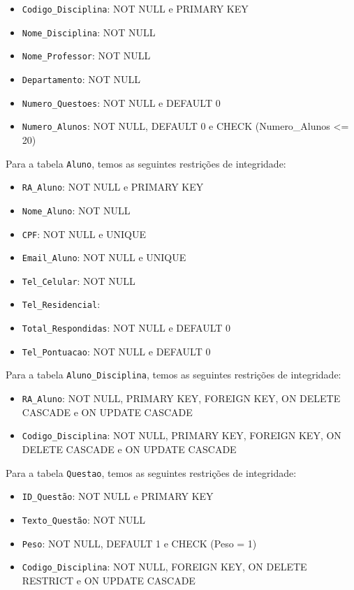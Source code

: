 \documentclass[12pt,a4paper]{article}
\begin{document}
\begin{itemize}
    \item {\texttt{Codigo\_Disciplina}}: NOT NULL e PRIMARY KEY
    \item {\texttt{Nome\_Disciplina}}: NOT NULL
    \item {\texttt{Nome\_Professor}}: NOT NULL
    \item {\texttt{Departamento}}: NOT NULL
    \item {\texttt{Numero\_Questoes}}: NOT NULL e DEFAULT 0
    \item {\texttt{Numero\_Alunos}}: NOT NULL, DEFAULT 0 e CHECK (Numero\_Alunos <= 20) 
\end{itemize}

\vspace{0.5cm}
Para a tabela \texttt{Aluno}, temos as seguintes restrições de integridade:

\begin{itemize}
    \item {\texttt{RA\_Aluno}}: NOT NULL e PRIMARY KEY
    \item {\texttt{Nome\_Aluno}}: NOT NULL
    \item \texttt{CPF}: NOT NULL e UNIQUE
    \item \texttt{Email\_Aluno}: NOT NULL e UNIQUE
    \item \texttt{Tel\_Celular}: NOT NULL
    \item \texttt{Tel\_Residencial}:
    \item \texttt{Total\_Respondidas}: NOT NULL e DEFAULT 0
    \item \texttt{Tel\_Pontuacao}: NOT NULL e DEFAULT 0
\end{itemize}

\vspace{0.5cm}
Para a tabela \texttt{Aluno\_Disciplina}, temos as seguintes restrições de integridade:

\begin{itemize}
    \item {\texttt{RA\_Aluno}}: NOT NULL, PRIMARY KEY, FOREIGN KEY, ON DELETE CASCADE e ON UPDATE CASCADE
    \item {\texttt{Codigo\_Disciplina}}: NOT NULL, PRIMARY KEY, FOREIGN KEY, ON DELETE CASCADE e ON UPDATE CASCADE
\end{itemize}

\vspace{0.5cm}
Para a tabela \texttt{Questao}, temos as seguintes restrições de integridade:

\begin{itemize}
    \item \texttt{ID\_Questão}: NOT NULL e PRIMARY KEY
    \item \texttt{Texto\_Questão}: NOT NULL
    \item \texttt{Peso}: NOT NULL, DEFAULT 1 e CHECK (Peso = 1)
    \item \texttt{Codigo\_Disciplina}: NOT NULL, FOREIGN KEY, ON DELETE RESTRICT e ON UPDATE CASCADE
\end{itemize}
\end{document}
